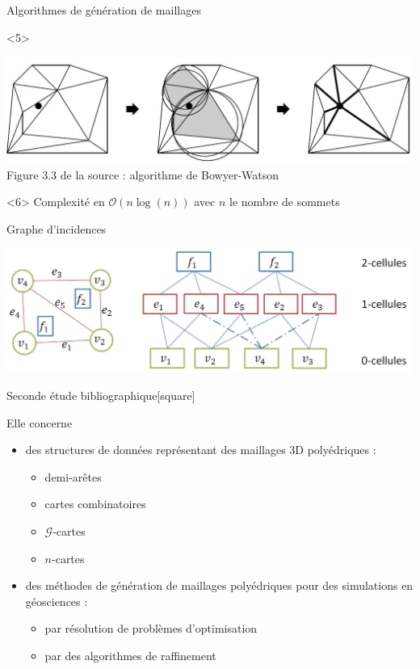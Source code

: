 \documentclass[aspectratio=169, 12pt, a4paper, hyperref={pdfauthor={Alexandre MARIN}, pdfkeywords={IFPEN, Delaunay, Voronoi, mesh generation}, colorlinks=true, linkcolor=purple, urlcolor=blue, citecolor=magenta}]{beamer}
\begin{document}
\begin{Energie}{Algorithmes de génération de maillages}
\begin{onlyenv}<5>
\begin{center}
\includegraphics[scale=0.5]{bowyerWatson.jpg}
\\Figure 3.3 de la source \cite{delnotes} : algorithme de Bowyer-Watson
\end{center}
\end{onlyenv}
\begin{onlyenv}<6>\vspace{1cm}
Complexité en $\mathcal{O}(n\log(n))$ avec $n$ le nombre de sommets
\end{onlyenv}

\end{Energie}

\begin{Energie}{Graphe d'incidences}
\begin{center}
\includegraphics[scale=0.45]{adjacencies.jpg}
\end{center}
\end{Energie}

\begin{Energie}{Seconde étude bibliographique}[square]

Elle concerne

\begin{itemize}
\item des structures de données représentant des maillages 3D polyédriques :
\begin{itemize}
\item demi-arêtes
\item cartes combinatoires
\item $\mathcal{G}$-cartes
\item $n$-cartes
\end{itemize}
\item des méthodes de génération de maillages polyédriques pour des simulations en géosciences :
\begin{itemize}
\item par résolution de problèmes d'optimisation
\item par des algorithmes de raffinement
\end{itemize}
\end{itemize}
\end{Energie}
\end{document}
